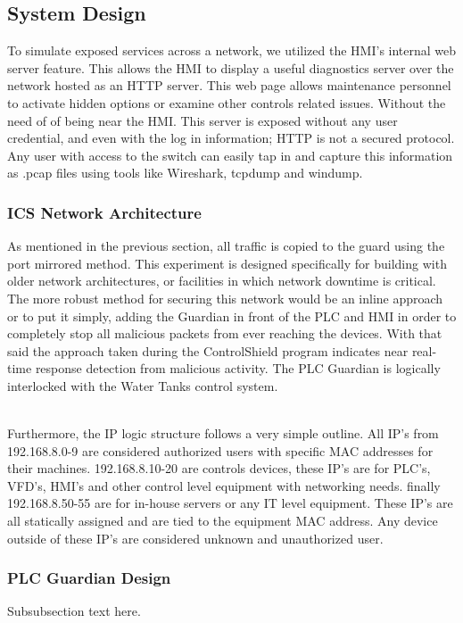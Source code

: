 \documentclass[journal]{IEEEtran}
\begin{document}
\subsection{System Design}
To simulate exposed services across a network, we utilized the HMI's internal web server
feature. This allows the HMI to display a useful diagnostics server over the network
hosted as an HTTP server. This web page allows maintenance personnel to activate
hidden options or examine other controls related issues. Without the need of of being
near the HMI. This server is exposed without any user credential, and even with the
log in information; HTTP is not a secured protocol. Any user with access to the switch
can easily tap in and capture this information as .pcap files using tools like
Wireshark, tcpdump and windump.

\subsubsection{ICS Network Architecture}
As mentioned in the previous section, all traffic is copied to the guard using the
port mirrored method. This experiment is designed specifically for building with
older network architectures, or facilities in which network downtime is critical.
The more robust method for securing this network would be an inline approach or to
put it simply, adding the Guardian in front of the PLC and HMI in order to completely
stop all malicious packets from ever reaching the devices. With that said the approach
taken during the ControlShield program indicates near real-time response detection from
malicious activity. The PLC Guardian is logically interlocked with the Water Tanks control
system.

\\Furthermore, the IP logic structure follows a very simple outline. All IP's from
192.168.8.0-9 are considered authorized users with specific MAC addresses for their
machines. 192.168.8.10-20 are controls devices, these IP's are for PLC's, VFD's, HMI's
and other control level equipment with networking needs. finally 192.168.8.50-55 are
for in-house servers or any IT level equipment. These IP's are all statically assigned
and are tied to the equipment MAC address. Any device outside of these IP's are
considered unknown and unauthorized user.

\subsubsection{PLC Guardian Design}
Subsubsection text here.
\end{document}
